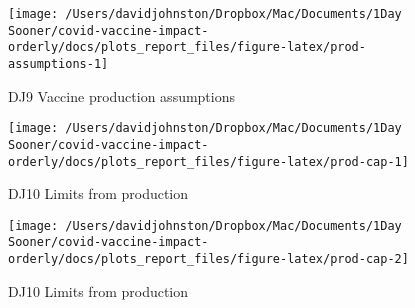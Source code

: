 \documentclass[
  12pt,
]{article}
\begin{document}
\begin{figure}

{\centering \texttt{[image: /Users/davidjohnston/Dropbox/Mac/Documents/1Day Sooner/covid-vaccine-impact-orderly/docs/plots\_report\_files/figure-latex/prod-assumptions-1]} 

}

\caption{DJ9 Vaccine production assumptions}\label{fig:prod-assumptions}
\end{figure}

\begin{figure}

{\centering \texttt{[image: /Users/davidjohnston/Dropbox/Mac/Documents/1Day Sooner/covid-vaccine-impact-orderly/docs/plots\_report\_files/figure-latex/prod-cap-1]} 

}

\caption{DJ10 Limits from production}\label{fig:prod-cap-1}
\end{figure}
\begin{figure}

{\centering \texttt{[image: /Users/davidjohnston/Dropbox/Mac/Documents/1Day Sooner/covid-vaccine-impact-orderly/docs/plots\_report\_files/figure-latex/prod-cap-2]} 

}

\caption{DJ10 Limits from production}\label{fig:prod-cap-2}
\end{figure}
\end{document}
